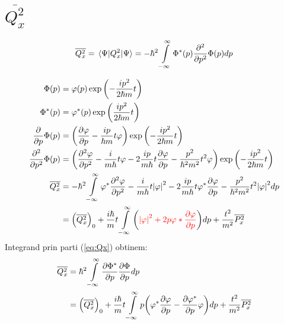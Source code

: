 \documentclass[11pt]{article} %
\newcommand*{\mathcolor}{}
\def\mathcolor#1#{\mathcoloraux{#1}}
\newcommand*{\mathcoloraux}[3]{%
  \protect\leavevmode
  \begingroup
    \color#1{#2}#3%
  \endgroup
}
\newcommand*\mean[1]{\overline{#1}}
\newcommand{\integral}{\int\limits_{-\infty}^{\infty}}
\begin{document}
\section{\(\mean{Q_x^2}\)}
\label{sec:Qx2}

\begin{equation}
\label{eq:Qx}
  \mean{Q_x^2} = \expval{Q_x^2}{\Psi} = -\hbar^2 \integral \Phi^*(p) \pdv[2]{p} \Phi(p) dp
\end{equation}

\begin{align*}
  \Phi(p) &= \varphi(p) \exp\qty(- \frac{i p^2}{2\hbar m} t) \\
  \Phi^*(p) &= \varphi^*(p) \exp\qty(\frac{i p^2}{2\hbar m} t) \\
  \pdv{p} \Phi(p) &= \qty(\pdv{\varphi}{p} - \frac{i p}{\hbar m} t \varphi)
    \exp\qty(- \frac{i p^2}{2\hbar m} t) \\
  \pdv[2]{p} \Phi(p) &= \qty(\pdv[2]{\varphi}{p} - \frac{i}{m \hbar} t \varphi
    - 2\frac{i p}{m \hbar} t \pdv{\varphi}{p} - \frac{p^2}{\hbar^2 m^2} t^2 \varphi)
    \exp\qty(- \frac{i p^2}{2\hbar m} t) \\
  \mean{Q_x^2} &= -\hbar^2 \integral \varphi^* \pdv[2]{\varphi}{p}
    - \frac{i}{m \hbar} t \abs{\varphi}^2 - 2\frac{i p}{m \hbar} t \varphi^* \pdv{\varphi}{p}
    - \frac{p^2}{\hbar^2 m^2} t^2 \abs{\varphi}^2 dp \\ &=
  \qty(\mean{Q_x^2})_0
    + \frac{i \hbar}{m} t \integral \qty(\mathcolor{red}{\abs{\varphi}^2 + 2p\varphi* \pdv{\varphi}{p}}) dp
    + \frac{t^2}{m^2} \mean{P_x^2} \\
\end{align*}
Integrand prin parti (\ref{eq:Qx}) obtinem:
\begin{align*}
  \mean{Q_x^2} &= \hbar^2 \integral \pdv{\Phi^*}{p} \pdv{\Phi}{p} dp \\ &=
    \qty(\mean{Q_x^2})_0
    + \frac{i \hbar}{m} t \integral p \qty(\varphi^* \pdv{\varphi}{p} - \pdv{\varphi^*}{p}\varphi)dp
    + \frac{t^2}{m^2} \mean{P_x^2} \\
\end{align*}
\end{document}
